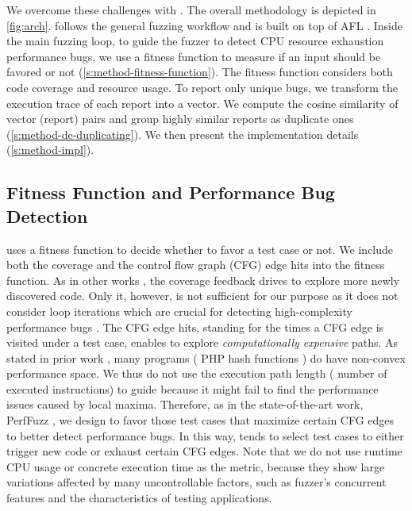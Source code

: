 We overcome these challenges with \sys.
%
The overall methodology is depicted in \autoref{fig:arch}.
%
\sys follows the general fuzzing workflow and is built on top of AFL \cite{afl}.
%
Inside the main fuzzing loop, 
%
to guide the fuzzer to detect CPU resource exhaustion performance bugs,
we use a fitness function to measure if an input should be favored or not
%
(\autoref{s:method-fitness-function}).
%
The fitness function considers both code coverage and resource usage.
%
To report only unique bugs, we transform the execution trace of each report into a vector.
%
We compute the cosine similarity of vector (report) pairs and group highly similar reports as duplicate ones (\autoref{s:method-de-duplicating}).
%
We then present the implementation details (\autoref{s:method-impl}).

\subsection{Fitness Function and Performance Bug Detection}
\label{s:method-fitness-function}
\sys uses a fitness function to decide whether to favor a test case or not.
%
%
%
We include both the coverage and the control flow graph (CFG) edge hits into the fitness function.
%
As in other works \cite{oss-fuzz, peng2018tfuzz, klees2018evaluating}, the coverage feedback drives \sys to explore more newly discovered code.
%
Only it, however, is not sufficient for our purpose as it does not consider loop iterations which are crucial for detecting high-complexity performance bugs \cite{slowfuzz}.
%
The CFG edge hits, standing for the times a CFG edge is visited under a test case, enables \sys to explore \emph{computationally expensive} paths.
%
As stated in prior work \cite{perffuzz}, many programs (\eg{,} PHP hash functions \cite{perffuzz, php-hash}) do have non-convex performance space.
%
We thus do not use the execution path length (\eg{,} number of executed instructions) to guide \sys because it might fail to find the performance issues caused by local maxima.
%
Therefore, as in the state-of-the-art work, PerfFuzz \cite{perffuzz}, we design \sys to favor those test cases that maximize certain CFG edges to better detect performance bugs.
%
In this way, \sys tends to select test cases to either trigger new code or exhaust certain CFG edges.
%
Note that we do not use runtime CPU usage or concrete execution time as the metric,
%
because they show large variations affected by many uncontrollable factors, such as fuzzer's concurrent features and the characteristics of testing applications.

